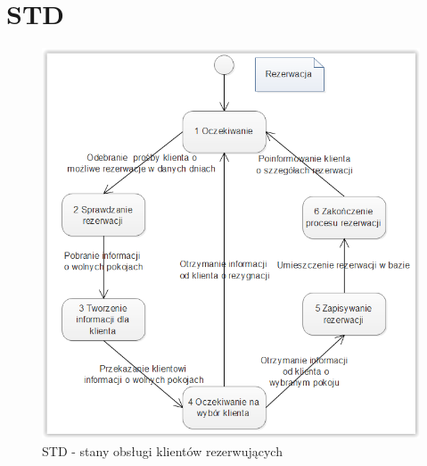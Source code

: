 \documentclass[a4paper, 11pt]{article}
\begin{document}
	
	
	\section{STD}
	\indent
	\begin{figure}[H]%
			\includegraphics[scale=0.9]{Img/STD-rezerwacja.png}
			\caption{STD - stany obsługi klientów rezerwujących}
	\end{figure} 
	
\end{document}
